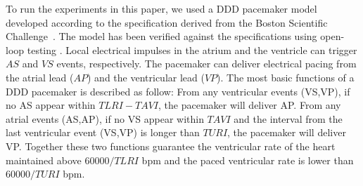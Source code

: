 To run the experiments in this paper, we used a DDD pacemaker model developed according to the specification derived from the Boston Scientific Challenge~\cite{challenge}.
The model has been verified against the specifications using open-loop testing \cite{testing}. Local electrical impulses in the atrium and the ventricle can trigger $AS$ and $VS$ events, respectively. The pacemaker can deliver electrical pacing from the atrial lead ($AP$) and the ventricular lead ($VP$). The most basic functions of a DDD pacemaker is described as follow: From any ventricular events (VS,VP), if no AS appear within $TLRI-TAVI$, the pacemaker will deliver AP. From any atrial events (AS,AP), if no VS appear within $TAVI$ and the interval from the last ventricular event (VS,VP) is longer than $TURI$, the  pacemaker will deliver VP. Together these two functions guarantee the ventricular rate of the heart maintained above $60000/TLRI$ bpm and the paced ventricular rate is lower than $60000/TURI$ bpm.

%
%
%
%
%
